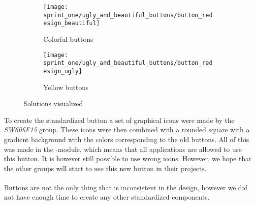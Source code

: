 \begin{figure}[!htbp]
    \centering

    \begin{subfigure}[t]{0.3\textwidth}
    	\centering
        \texttt{[image: sprint\_one/ugly\_and\_beautiful\_buttons/button\_redesign\_beautiful]}
        \caption{Colorful buttons}
        \label{fig:ugly_and_beautiful_buttons_example_one}
    \end{subfigure}
    \hspace{5em} 
    \begin{subfigure}[t]{0.3\textwidth}
    	\centering
        \texttt{[image: sprint\_one/ugly\_and\_beautiful\_buttons/button\_redesign\_ugly]}
        \caption{Yellow buttons}
        \label{fig:ugly_and_beautiful_buttons_example_two}
    \end{subfigure}
    
    \caption{Solutions visualized}
    \label{fig:ugly_and_beautiful_buttons_example_solution}
\end{figure}

To create the standardized button a set of graphical icons were made by the \emph{SW606F15} group. These icons were then combined with a rounded square with a gradient background with the colors corresponding to the old buttons. All of this was made in the -module, which means that all applications are allowed to use this button. It is however still possible to use wrong icons. However, we hope that the other groups will start to use this new button in their projects.
\\\\
Buttons are not the only thing that is inconsistent in the design, however we did not have enough time to create any other standardized components. 
